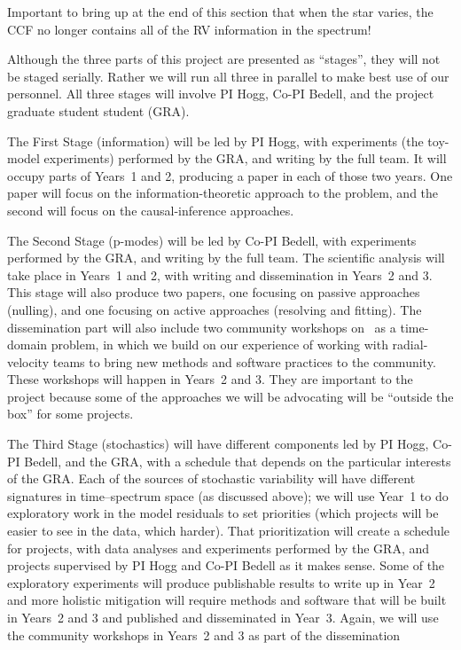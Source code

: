 \documentclass[12pt, letterpaper]{article}
\begin{document}

Important to bring up at the end of this section that when the star
varies, the CCF no longer contains all of the RV information in the
spectrum!




Although the three parts of this project are presented as ``stages'',
they will not be staged serially.
Rather we will run all three in parallel to make best use of our
personnel.
All three stages will involve PI Hogg, Co-PI Bedell, and the project
graduate student student (GRA). 

The First Stage (information) will be led by PI Hogg, with experiments (the
toy-model experiments) performed by the GRA, and writing by the full
team.
It will occupy parts of Years~1 and 2, producing a paper
in each of those two years.
One paper will focus on the information-theoretic approach to the problem,
and the second will focus on the causal-inference approaches.

The Second Stage (p-modes) will be led by Co-PI Bedell, with
experiments performed by the GRA, and writing by the full team.
The scientific analysis will take place in Years~1 and 2, with
writing and dissemination in Years~2 and 3.
This stage will also produce two papers, one focusing on passive
approaches (nulling), and one focusing on active approaches (resolving
and fitting).
The dissemination part will also include two community workshops on
\EPRV\ as a time-domain problem, in which we build on our experience
of working with radial-velocity teams to bring new methods and
software practices to the community.
These workshops will happen in Years~2 and 3.
They are important to the project because some of the approaches we
will be advocating will be ``outside the box'' for some projects.

The Third Stage (stochastics) will have different components led by PI
Hogg, Co-PI Bedell, and the GRA, with a schedule that depends on the
particular interests of the GRA.
Each of the sources of stochastic variability will have different
signatures in time--spectrum space (as discussed above); we will use
Year~1 to do exploratory work in the model residuals to set priorities
(which projects will be easier to see in the data, which harder).
That prioritization will create a schedule for projects, with data
analyses and experiments performed by the GRA, and projects supervised
by PI Hogg and Co-PI Bedell as it makes sense.
Some of the exploratory experiments will produce publishable results
to write up in Year~2 and more holistic mitigation will require
methods and software that will be built in Years~2 and 3 and published
and disseminated in Year~3.
Again, we will use the community workshops in Years~2 and 3 as part of
the dissemination
\end{document}
